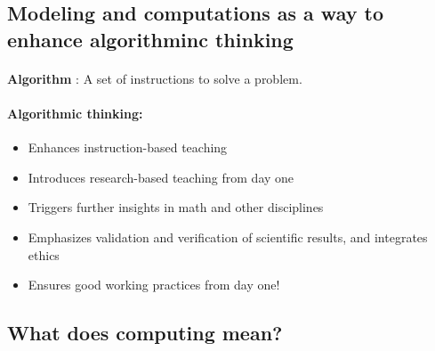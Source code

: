 \documentclass[%
oneside,                 %
final,                   %
10pt]{article}
\begin{document}
\noindent



\subsection{Modeling and computations as a way to enhance algorithminc thinking}


\paragraph{}
\textbf{Algorithm} :
A set of instructions to solve a problem.




\paragraph{Algorithmic thinking:}
\begin{itemize}
\item Enhances instruction-based teaching

\item Introduces research-based teaching  from day one

\item Triggers further insights in math and other disciplines

\item Emphasizes validation and verification of scientific results, and integrates ethics

\item Ensures good working practices from day one!
\end{itemize}

\noindent





\subsection{What does computing mean?}


\paragraph{}
\end{document}
